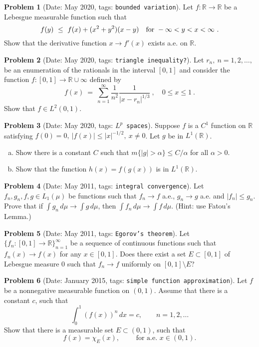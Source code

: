 \documentclass[11pt, notitlepage]{article}
\theoremstyle{definition}
\theoremstyle{definition}
\theoremstyle{definition}
\newtheorem{probstate}{Problem}
\theoremstyle{remark}
\newenvironment{problem}[2]{
    \begin{probstate}[Date: #1, tags: \texttt{#2}]
}
{
  \end{probstate}
}
\newcommand{\R}{\mathbb{R}}
\begin{document}
\begin{problem}{May 2020}{bounded variation}
  Let $f:\mathbb{R}\to\mathbb{R}$ be a Lebesgue measurable function such that
$$
f(y) \ \le \ f(x)+(x^2+y^2)(x-y) \quad {\rm for \ } -\infty<y<x<\infty \ .
$$
Show that the derivative function $x\to f'(x)$ exists a.e. on $\mathbb{R}$.
\end{problem}

\begin{problem}{May 2020}{triangle inequality?}
  Let $r_n, \ n=1,2,\ldots,$ be an enumeration of the rationals in the interval $[0,1]$ and consider the function  $f:[0,1]\to\mathbb{R}\cup{\infty}$ defined by
$$
f(x) \ = \ \sum_{n=1}^\infty \frac{1}{n^2}\frac{1}{|x-r_n|^{1/3}} \ , \quad 0\le x\le 1 \ .
$$
Show that $f\in L^2(0,1)$.
\end{problem}


\begin{problem}{May 2020}{$L^p$ spaces}
Suppose $f$ is a $C^1$ function on $\mathbb{R}$ satisfying $f(0)=0, \ |f(x)|\le |x|^{-1/2}, \ x\ne 0$. Let $g$ be in  $L^1(\mathbb{R})$.
\begin{enumerate}[(a)]
\item Show there is a constant $C$ such that $m\{|g|>\alpha\}\le C/\alpha$ for all $\alpha>0$.

\item Show that the function $h(x)=f(g(x))$ is in $L^1(\mathbb{R})$.
\end{enumerate}
\end{problem}

\begin{problem}{May 2011}{integral convergence}
  Let $f_n,g_n,f,g \in L_1(\mu)$ be functions such that
    $f_n \to f$ a.e., $g_n \to g$ a.e. and $|f_n| \le g_n$. Prove
    that if $\int g_n \, d \mu \to \int g \, d \mu$, then
    $\int f_n \, d \mu \to \int f \, d \mu$.
    (Hint: use Fatou's Lemma.)
\end{problem}

\begin{problem}{May 2011}{Egorov's theorem}
  Let $\{f_n: [0,1] \to \R\}_{n=1}^\infty$ be a sequence of continuous functions
     such that $f_n(x) \to f(x)$ for any $x \in [0,1]$. Does there
     exist a set $E \subset [0,1]$ of Lebesgue measure 0 such that
     $f_n \to f$ uniformly on $[0,1] \setminus E$?
\end{problem}

\begin{problem}{January 2015}{simple function approximation}
Let $f$ be a nonnegative measurable function on $(0,1)$. Assume that there is a constant $c$, such that
$$\int_0^1 (f(x))^n\,dx=c,\qquad n=1,2,\dots$$
Show that there is a measurable set $E\subset (0,1)$, such that
$$f(x)=\chi_E(x),\qquad \text{ for a.e. }  x\in(0,1).$$
\end{problem}
\end{document}
